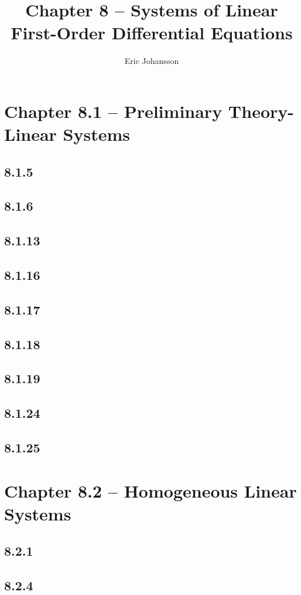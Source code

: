 \documentclass{article}
\title{Chapter 8 -- Systems of Linear First-Order Differential Equations}
\author{Eric Johansson}
\begin{document}
\maketitle
\tableofcontents
\newpage

\section{Chapter 8.1 -- Preliminary Theory-Linear Systems}

\subsection{8.1.5}
\subsection{8.1.6}
\subsection{8.1.13}
\subsection{8.1.16}
\subsection{8.1.17}
\subsection{8.1.18}
\subsection{8.1.19}
\subsection{8.1.24}
\subsection{8.1.25}

    
\section{Chapter 8.2 -- Homogeneous Linear Systems}

\subsection{8.2.1}
\subsection{8.2.4}
\end{document}
